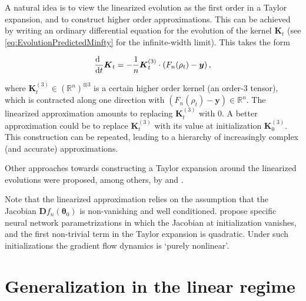  A natural idea is to view the linearized evolution as the first order in a Taylor expansion, and to construct higher order approximations. This can be achieved by writing an ordinary differential equation for the evolution of the kernel ${\boldsymbol K}_t$ (see
 \eqref{eq:EvolutionPredictedMinfty} for the infinite-width limit). This takes the form \cite{huang2020dynamics} 

 \begin{align}
   \frac{{\rm d}\phantom{t}}{{\rm d} t}{\boldsymbol K}_t = -\frac{1}{n}{\boldsymbol K}^{(3)}_t\cdot(F_n(\rho_t)-{\boldsymbol y})\, ,
 \end{align}

 where ${\boldsymbol K}^{(3)}_t\in ({\mathbb R}^n)^{\otimes 3}$ is a certain higher order kernel (an order-$3$ tensor), which is contracted along one direction with $(F_n(\rho_t)-{\boldsymbol y})\in {\mathbb R}^n$. The linearized approximation amounts to replacing ${\boldsymbol K}^{(3)}_t$ with $0$. A better approximation could be to replace ${\boldsymbol K}^{(3)}_t$ with its value at initialization ${\boldsymbol K}^{(3)}_0$. This construction can be repeated, leading to a hierarchy of increasingly complex (and accurate) approximations. 

 Other approaches towards constructing a Taylor expansion around the linearized evolutions were proposed, among others,  by \cite{dyer2019asymptotics} and \cite{hanin2019finite}.

 Note that the linearized approximation relies on the assumption that the Jacobian ${\boldsymbol D} f_n({\boldsymbol \theta}_0)$ is non-vanishing and well conditioned. \cite{bai2019beyond} propose specific neural network parametrizations in which the Jacobian at initialization vanishes, and the first non-trivial term in the Taylor expansion is quadratic. Under such initializations the gradient flow dynamics is `purely nonlinear'.

\section{Generalization in the linear regime}

\label{sec:NTK}

